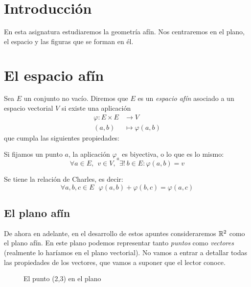 
\section*{Introducción}
En esta asignatura estudiaremos la geometría afín. Nos centraremos en el plano, el espacio y las figuras que se forman en él.
\newpage

\section{El espacio afín}
\begin{ndef}
  Sea $E$ un conjunto no vacío. Diremos que $E$ es un \textit{espacio afín} asociado a un espacio vectorial $V$ si existe una aplicación
  \begin{align*}
    \varphi: E \times E & \rightarrow V \\
    (a,b) & \mapsto \varphi(a,b)
  \end{align*}
  que cumpla las siguientes propiedades:
  \begin{nlist}
  \item Si fijamos un punto $a$, la aplicación $\varphi_a$ es biyectiva, o lo que es lo mismo:
    $$\forall a \in E, \ \ v \in V, \ \ \exists! \ b \in E:\varphi(a,b)=v$$
  \item Se tiene la relación de Charles, es decir:
    $$\forall a, b, c \in E \ \ \  \varphi(a,b) + \varphi(b,c) = \varphi(a,c)$$
  \end{nlist}
\end{ndef}
\subsection{El plano afín}

De ahora en adelante, en el desarrollo de estos apuntes consideraremos $\mathbb{R}^2$ como el plano afín. En este plano podemos representar tanto \textit{puntos} como \textit{vectores} (realmente lo haríamos en el plano vectorial). No vamos a entrar a detallar todas las propiedades de los vectores, que vamos a suponer que el lector conoce. \\

\begin{figure}[h]
	\sffamily
  \centering
  \caption{El punto (2,3) en el plano}
\end{figure}

